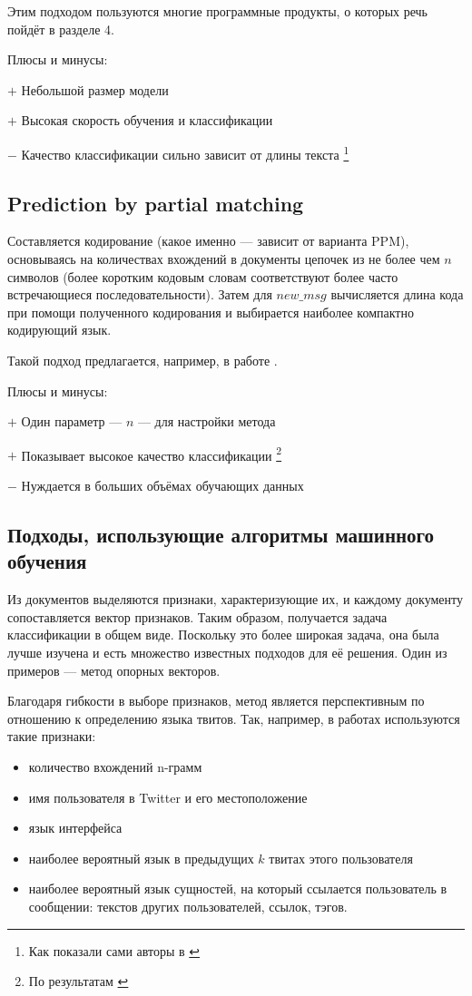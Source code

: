 \documentclass[a4paper, 14pt]{article}
\begin{document}
		Этим подходом пользуются многие программные продукты, о которых речь пойдёт
		в разделе 4.
		
		\noindent Плюсы и минусы:
		
		
		$+$ Небольшой размер модели
		
		$+$ Высокая скорость обучения и классификации
		
		$-$ Качество классификации сильно зависит от длины текста \footnote{Как показали сами авторы в \cite{canvar}}
		
		\subsection{Prediction by partial matching}
		Составляется кодирование (какое именно --- зависит от варианта PPM), основываясь на количествах вхождений в документы цепочек из не более чем $n$ символов (более коротким кодовым словам соответствуют более часто встречающиеся последовательности). Затем для $new\_msg$ вычисляется длина кода при помощи полученного кодирования и выбирается наиболее
		компактно кодирующий язык.
		
		Такой подход предлагается, например, в работе \cite{ppm}.
		
		\noindent Плюсы и минусы:
		
		$+$ 	Один параметр --- $n$ --- для настройки метода
		
		$+$ Показывает высокое качество классификации \footnote{По результатам \cite{ppm}}
		
		$-$ Нуждается в больших объёмах обучающих данных
		
		\subsection{Подходы, использующие алгоритмы машинного обучения}
		Из документов выделяются признаки, характеризующие их, и каждому документу сопоставляется вектор признаков. 
		Таким образом, получается задача классификации в общем виде. Поскольку это более широкая задача, она была
		лучше изучена и есть множество известных подходов для её решения. Один из примеров --- 
		метод опорных векторов.
		 
		Благодаря гибкости в выборе признаков, метод является перспективным по отношению к определению языка твитов. Так, например, в работах \cite{ppm} \cite{lrev}
		используются такие признаки: 
		\begin{itemize}
			\item количество вхождений n-грамм
			\item имя пользователя в Twitter и его местоположение
			\item язык интерфейса
			\item наиболее вероятный язык в предыдущих $k$ твитах этого пользователя
			\item наиболее вероятный язык сущностей, на который ссылается пользователь в сообщении: текстов
		других пользователей, ссылок, тэгов.
		\end{itemize}		
		
\end{document}
